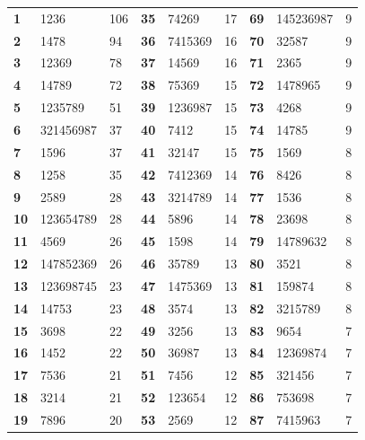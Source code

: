 	  \begin{table}[H]
	    \centering
	    \begin{tabular}{l | l l | l | l l  | l | l l }
	      \hline
	      {\bf 1}  & 1236       & 106 & {\bf 35} & 74269    & 17 & {\bf 69} & 145236987 & 9 \\
	      {\bf 2}  & 1478       & 94  & {\bf 36} & 7415369  & 16 & {\bf 70} & 32587 & 9 \\ 
	      {\bf 3}  & 12369      & 78  & {\bf 37} & 14569    & 16 & {\bf 71} & 2365 & 9 \\ 
	      {\bf 4}  & 14789      & 72  & {\bf 38} & 75369    & 15 & {\bf 72} & 1478965 & 9 \\ 
	      {\bf 5}  & 1235789    & 51  & {\bf 39} & 1236987  & 15 & {\bf 73} & 4268 & 9 \\ 
	      {\bf 6}  & 321456987  & 37  & {\bf 40} & 7412     & 15 & {\bf 74} & 14785 & 9 \\  
	      {\bf 7}  & 1596       & 37  & {\bf 41} & 32147    & 15 & {\bf 75} & 1569 & 8 \\ 
	      {\bf 8}  & 1258       & 35  & {\bf 42} & 7412369  & 14 & {\bf 76} & 8426 & 8 \\ 
	      {\bf 9}  & 2589       & 28  & {\bf 43} & 3214789  & 14 & {\bf 77} & 1536 & 8 \\ 
	      {\bf 10} & 123654789  & 28  & {\bf 44} & 5896     & 14 & {\bf 78} & 23698 & 8 \\ 
	      {\bf 11} & 4569       & 26  & {\bf 45} & 1598     & 14 & {\bf 79} & 14789632 & 8 \\ 
	      {\bf 12} & 147852369  & 26  & {\bf 46} & 35789    & 13 & {\bf 80} & 3521 & 8 \\ 
	      {\bf 13} & 123698745  & 23  & {\bf 47} & 1475369  & 13 & {\bf 81} & 159874 & 8 \\ 
	      {\bf 14} & 14753      & 23  & {\bf 48} & 3574     & 13 & {\bf 82} & 3215789 & 8 \\ 
	      {\bf 15} & 3698       & 22  & {\bf 49} & 3256     & 13 & {\bf 83} & 9654 & 7 \\ 
	      {\bf 16} & 1452       & 22  & {\bf 50} & 36987    & 13 & {\bf 84} & 12369874 & 7 \\ 
	      {\bf 17} & 7536       & 21  & {\bf 51} & 7456     & 12 & {\bf 85} & 321456 & 7 \\ 
	      {\bf 18} & 3214       & 21  & {\bf 52} & 123654   & 12 & {\bf 86} & 753698 & 7 \\ 
	      {\bf 19} & 7896       & 20  & {\bf 53} & 2569     & 12 & {\bf 87} & 7415963 & 7 \\ 

\end{tabular}
\end{table}
